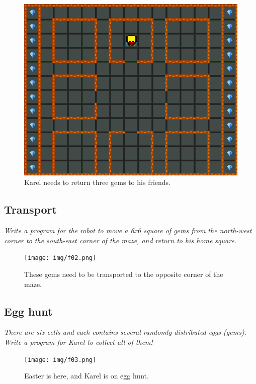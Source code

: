 \begin{figure}[!ht]
\begin{center}
\includegraphics[height=0.4\textwidth]{img/f08.png}
\end{center}
\vspace{-4mm}
\caption{Karel needs to return three gems to his friends.}
\label{fig:f08}
\vspace{-12mm}
\end{figure}

\subsection{Transport}

{\em Write a program for the robot to move a 6x6 square of gems from the north-west
corner to the south-east corner of the maze, and return to his home square.}\\[-7mm]

\begin{figure}[!ht]
\begin{center}
\texttt{[image: img/f02.png]}
\end{center}
\vspace{-4mm}
\caption{These gems need to be transported to the opposite corner of the maze.}
\label{fig:f02}
\end{figure}
\vspace{-12mm}
\newpage

\subsection{Egg hunt}

{\em There are six cells and each contains several randomly distributed eggs (gems). 
Write a program for Karel to collect all of them!}\\[-9mm]


\begin{figure}[!ht]
\begin{center}
\texttt{[image: img/f03.png]}
\end{center}
\vspace{-4mm}
\caption{Easter is here, and Karel is on egg hunt.}
\vspace{-1.2cm}
\label{fig:f03}
\end{figure}


